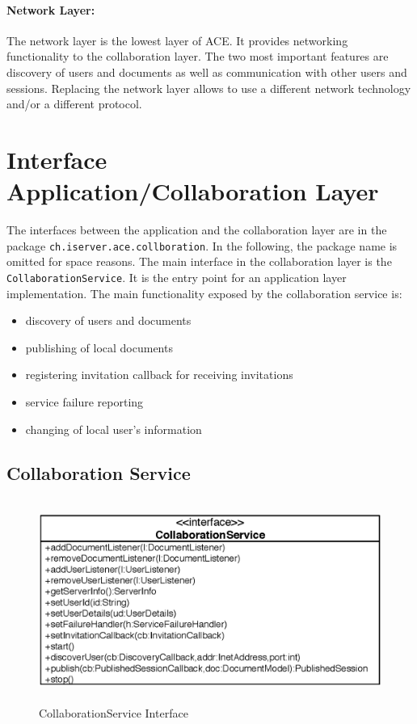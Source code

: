 \paragraph{Network Layer:} The network layer is the lowest layer of ACE. It 
provides networking functionality to the collaboration layer. The two most 
important features are discovery of users and documents as well as communication 
with other users and sessions. Replacing the network layer allows to use a 
different network technology and/or a different protocol.



\section{Interface Application/Collaboration Layer}
The interfaces between the application and the collaboration layer are in
the package \texttt{ch.\-iserver.\-ace.\-collboration}. In the following,
the package name is omitted for space reasons. The main interface in
the collaboration layer is the \texttt{Collaboration\-Service}.
It is the entry point for an application layer implementation. The main 
functionality exposed by the collaboration service is:
\begin{itemize}
 \item discovery of users and documents
 \item publishing of local documents
 \item registering invitation callback for receiving invitations
 \item service failure reporting
 \item changing of local user's information
\end{itemize}


\subsection{Collaboration Service}

\begin{figure}[H]
 \centering
 \includegraphics[width=13.19cm,height=6.63cm]{../images/finalreport/architecture_collaborationservice_uml.eps}
 \caption{CollaborationService Interface}
\end{figure}

